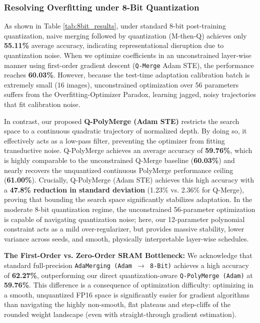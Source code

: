 \subsubsection{Resolving Overfitting under 8-Bit Quantization}
As shown in Table \ref{tab:8bit_results}, under standard 8-bit post-training quantization, naive merging followed by quantization (M-then-Q) achieves only \textbf{55.11\%} average accuracy, indicating representational disruption due to quantization noise. When we optimize coefficients in an unconstrained layer-wise manner using first-order gradient descent (\texttt{Q-Merge} Adam STE), the performance reaches \textbf{60.03\%}. However, because the test-time adaptation calibration batch is extremely small (16 images), unconstrained optimization over 56 parameters suffers from the Overfitting-Optimizer Paradox, learning jagged, noisy trajectories that fit calibration noise.

In contrast, our proposed \textbf{Q-PolyMerge (Adam STE)} restricts the search space to a continuous quadratic trajectory of normalized depth. By doing so, it effectively acts as a low-pass filter, preventing the optimizer from fitting transductive noise. Q-PolyMerge achieves an average accuracy of \textbf{59.76\%}, which is highly comparable to the unconstrained Q-Merge baseline (\textbf{60.03\%}) and nearly recovers the unquantized continuous PolyMerge performance ceiling (\textbf{61.00\%}). Crucially, Q-PolyMerge (Adam STE) achieves this high accuracy with a \textbf{47.8\% reduction in standard deviation} (1.23\% vs. 2.36\% for Q-Merge), proving that bounding the search space significantly stabilizes adaptation. In the moderate 8-bit quantization regime, the unconstrained 56-parameter optimization is capable of navigating quantization noise; here, our 12-parameter polynomial constraint acts as a mild over-regularizer, but provides massive stability, lower variance across seeds, and smooth, physically interpretable layer-wise schedules.

\textbf{The First-Order vs. Zero-Order SRAM Bottleneck:} We acknowledge that standard full-precision \texttt{AdaMerging (Adam $\to$ 8-Bit)} achieves a high accuracy of \textbf{62.27\%}, outperforming our direct quantization-aware \texttt{Q-PolyMerge (Adam)} at \textbf{59.76\%}. This difference is a consequence of optimization difficulty: optimizing in a smooth, unquantized FP16 space is significantly easier for gradient algorithms than navigating the highly non-smooth, flat plateaus and step-cliffs of the rounded weight landscape (even with straight-through gradient estimation). 

